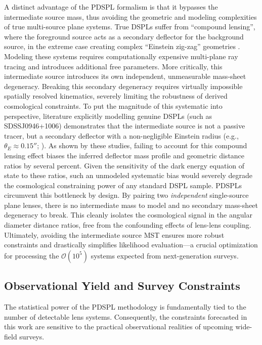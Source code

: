 \documentclass[a4paper,11pt]{article}
\begin{document}
A distinct advantage of the PDSPL formalism is that it bypasses the intermediate source mass, thus avoiding the geometric and modeling complexities of true multi-source plane systems. True DSPLs suffer from ``compound lensing'', where the foreground source acts as a secondary deflector for the background source, in the extreme case creating complex ``Einstein zig-zag'' geometries \cite{Collett:2016, Dux:2025}. Modeling these systems requires computationally expensive multi-plane ray tracing and introduces additional free parameters. More critically, this intermediate source introduces its own independent, unmeasurable mass-sheet degeneracy. Breaking this secondary degeneracy requires virtually impossible spatially resolved kinematics, severely limiting the robustness of derived cosmological constraints. To put the magnitude of this systematic into perspective, literature explicitly modelling genuine DSPLs (such as SDSSJ0946+1006) demonstrates that the intermediate source is not a passive tracer, but a secondary deflector with a non-negligible Einstein radius (e.g., $\theta_{E} \approx 0.15''$; \cite{Collett:2014, Collett:2016}). As shown by these studies, failing to account for this compound lensing effect biases the inferred deflector mass profile and geometric distance ratios by several percent. Given the sensitivity of the dark energy equation of state to these ratios, such an unmodeled systematic bias would severely degrade the cosmological constraining power of any standard DSPL sample. PDSPLs circumvent this bottleneck by design. By pairing two \textit{independent} single-source plane lenses, there is no intermediate mass to model and no secondary mass-sheet degeneracy to break. This cleanly isolates the cosmological signal in the angular diameter distance ratios, free from the confounding effects of lens-lens coupling. Ultimately, avoiding the intermediate source MST ensures more robust constraints and drastically simplifies likelihood evaluation—a crucial optimization for processing the $\mathcal{O}(10^5)$ systems expected from next-generation surveys.

\subsection{Observational Yield and Survey Constraints}
\label{sec:discussion:observational_constraints}
The statistical power of the PDSPL methodology is fundamentally tied to the number of detectable lens systems. Consequently, the constraints forecasted in this work are sensitive to the practical observational realities of upcoming wide-field surveys.
\end{document}
